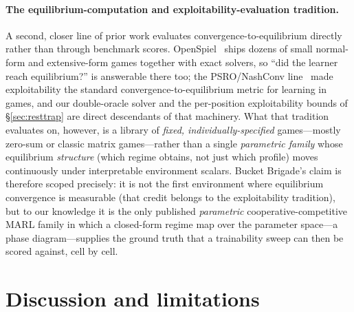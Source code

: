 \documentclass{anvil-paper}
\begin{document}
\paragraph{The equilibrium-computation and exploitability-evaluation
tradition.} A second, closer line of prior work evaluates
convergence-to-equilibrium directly rather than through benchmark
scores. OpenSpiel~\citep{openspiel2019} ships dozens of small
normal-form and extensive-form games together with exact solvers, so
``did the learner reach equilibrium?'' is answerable there too; the
PSRO/NashConv line~\citep{psro2017} made exploitability the standard
convergence-to-equilibrium metric for learning in games, and our
double-oracle solver and the per-position exploitability bounds of
\S\ref{sec:resttrap} are direct descendants of that machinery. What
that tradition evaluates on, however, is a library of \emph{fixed,
individually-specified} games---mostly zero-sum or classic matrix
games---rather than a single \emph{parametric family} whose
equilibrium \emph{structure} (which regime obtains, not just which
profile) moves continuously under interpretable environment scalars.
Bucket Brigade's claim is therefore scoped precisely: it is not the
first environment where equilibrium convergence is measurable (that
credit belongs to the exploitability tradition), but to our knowledge
it is the only published \emph{parametric} cooperative-competitive
MARL family in which a closed-form regime map over the parameter
space---a phase diagram---supplies the ground truth that a trainability
sweep can then be scored against, cell by cell.

\section{Discussion and limitations}
\label{sec:discussion}
\end{document}
